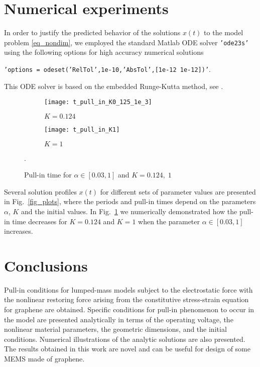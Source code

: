 \documentclass[review]{elsarticle}
\begin{document}
\section{{N}umerical experiments}
In order to justify the predicted behavior of the solutions $x(t)$ to the model problem \eqref{eq_nondim},
we employed the standard Matlab ODE solver \texttt{'ode23s'} using the following options for high accuracy numerical 
solutions 
\begin{center}
\texttt{'options = odeset('RelTol',1e-10,'AbsTol',[1e-12 1e-12])'}.
\end{center}
This ODE solver is based on the embedded Runge-Kutta method, see \cite{Shampine}.
\begin{figure}[htb]
\begin{center}
\begin{subfigure}[htb]{0.42\textwidth}
 \begin{center}
    \texttt{[image: t\_pull\_in\_K0\_125\_1e\_3]}
    \caption{$K=0.124$}
  \end{center}
   \end{subfigure}\qquad
\begin{subfigure}[htb]{0.32\textwidth}
 \begin{center}
    \texttt{[image: t\_pull\_in\_K1]}
    \caption{$K=1$ }
  \end{center}
\end{subfigure}
\caption{Pull-in time for $\alpha\in [0.03,1]$ and $K=0.124,\; 1$}. \label{fig_pull_in}
  \end{center}
\end{figure}
Several solution profiles $x(t)$ for different sets of parameter values are presented in Fig.~\ref{fig_plots}, where the periods and pull-in times depend on the parameters $\alpha$, $K$ and the initial values. 
In Fig.~\ref{fig_pull_in} we numerically demonstrated how the pull-in time decreases for $K=0.124$ and $K=1$ when the parameter $\alpha\in [0.03,1]$ increases. 
\section{{C}onclusions} Pull-in conditions for lumped-mass models subject to the electrostatic force with the nonlinear restoring force arising from the constitutive stress-strain equation for graphene are obtained. Specific conditions for pull-in phenomenon to occur in the model are presented analytically in terms of the operating voltage, the nonlinear material parameters, the geometric dimensions, and the initial conditions. Numerical illustrations of the analytic solutions are also presented. The results obtained in this work are novel and can be useful for design of some MEMS made of graphene.\\
\end{document}
